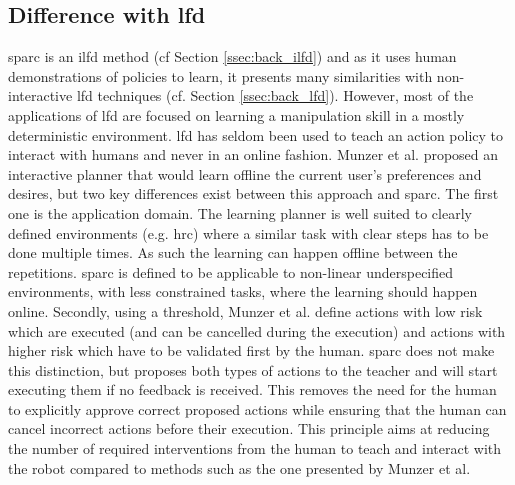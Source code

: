 \subsection{Difference with \gls{lfd}}

\gls{sparc} is an \gls{ilfd} method (cf Section \ref{ssec:back_ilfd}) and as it uses human demonstrations of policies to learn, it presents many similarities with non-interactive \gls{lfd} techniques (cf. Section \ref{ssec:back_lfd}). However, most of the applications of \gls{lfd} \citep{argall2009survey,billard2008robot} are focused on learning a manipulation skill in a mostly deterministic environment. \gls{lfd} has seldom been used to teach an action policy to interact with humans \citep{liu2014train,sequeira2016discovering,munzer2017efficient} and never in an online fashion. Munzer et al. proposed an interactive planner that would learn offline the current user's preferences and desires, but two key differences exist between this approach and \gls{sparc}. The first one is the application domain. The learning planner is well suited to clearly defined environments (e.g. \gls{hrc}) where a similar task with clear steps has to be done multiple times. As such the learning can happen offline between the repetitions. \gls{sparc} is defined to be applicable to non-linear underspecified environments, with less constrained tasks, where the learning should happen online. Secondly, using a threshold, Munzer et al. define actions with low risk which are executed (and can be cancelled during the execution) and actions with higher risk which have to be validated first by the human. \gls{sparc} does not make this distinction, but proposes both types of actions to the teacher and will start executing them if no feedback is received. This removes the  need for the human to explicitly approve correct proposed actions while ensuring that the human can cancel incorrect actions before their execution. This principle aims at reducing the number of required interventions from the human to teach and interact with the robot compared to methods such as the one presented by Munzer et al. 

    

